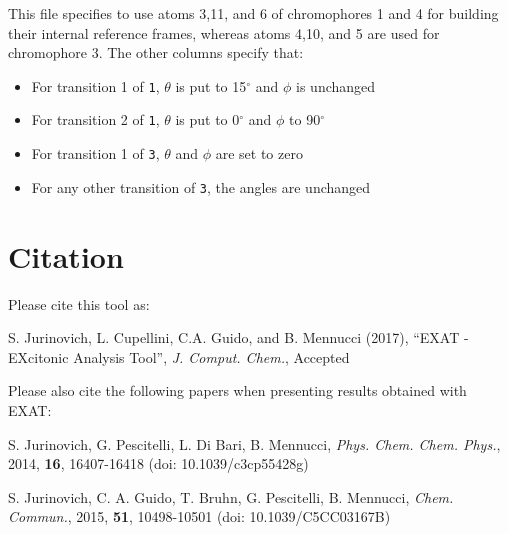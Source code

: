 \documentclass[a4paper,11pt]{article}
\begin{document}
This file specifies to use atoms 3,11, and 6 of chromophores 1 and 4 for building their internal reference frames, whereas atoms 4,10, and 5 are used for chromophore 3. 
The other columns specify that:
\begin{itemize}
\item For transition 1 of \texttt{1}, $\theta$ is put to 15$^{\circ}$ and $\phi$ is unchanged
\item For transition 2 of \texttt{1}, $\theta$ is put to 0$^{\circ}$ and $\phi$ to 90$^{\circ}$ 
\item For transition 1 of \texttt{3}, $\theta$ and $\phi$ are set to zero
\item For any other transition of \texttt{3}, the angles are unchanged 
\end{itemize}


\section{Citation}

Please cite this tool as: 

S. Jurinovich, L. Cupellini, C.A. Guido, and B. Mennucci (2017),  ``EXAT - EXcitonic Analysis Tool'', \emph{J. Comput. Chem.}, Accepted


Please also cite the following papers when presenting results obtained with EXAT:


S. Jurinovich, G. Pescitelli, L. Di Bari, B. Mennucci, \emph{Phys. Chem. Chem. Phys.}, 2014, \textbf{16}, 16407-16418 (doi: 10.1039/c3cp55428g)

S. Jurinovich, C. A. Guido, T. Bruhn, G. Pescitelli, B. Mennucci,  \emph{Chem. Commun.}, 2015, \textbf{51}, 10498-10501 (doi: 10.1039/C5CC03167B)
\end{document}
